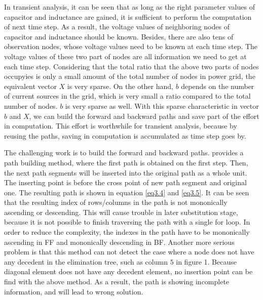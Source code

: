 \documentclass[conference]{IEEEtran}
\begin{document}
In transient analysis, it can be seen that as long as the right parameter values of capacitor and inductance are gained, it is 
sufficient to 
perform the computation of next time step. As a result, the voltage values of neighboring nodes of capacitor and inductance should be 
known. Besides, there are also tens of observation nodes, whose voltage values need to be known at each time step. The voltage values of
these two part of nodes are all information we need to get at each time step. Considering that the
total ratio that the above two parts of nodes occupyies is only a small amount of the total number of nodes in power grid, the equivalent
vector $X$ is very sparse. On the other hand, $b$ depends on the number of current sources in the grid, which is very small a ratio 
compared to the total number of nodes. $b$ is very sparse as well. With this sparse characteristic in vector $b$ and $X$, we can build the
forward and backward paths and save part of the effort in computation. This effort is worthwhile for transient analysis, because by 
reusing the paths, saving in computation is accumulated as time step goes by.

The challenging work is to build the forward and backward paths. \cite{Tinney} provides a path building method, where the first path is 
obtained on the first step. Then, the next path segments will be inserted into the original path as a whole unit. The inserting point is 
before the cross point of new path segment and original one. The resulting path is shown in equation \eqref{eq3.4} and \eqref{eq3.5}. It
can be seen that the resulting index of rows/columns in the path is not mononically ascending or descending. This will cause trouble in
later substitution stage, because it is not possible to finish traversing the path with a single for loop. In order to reduce the 
complexity, the indexes in the path have to be mononically ascending in FF and mononically descending in BF. Another more serious problem
is that this method can not detect the case where a node does not have any decedent in the elimination tree, such as column $5$ in figure 
1. Because diagonal element does not have any decedent element, no insertion point can be find with the above method. As a result, the 
path is showing incomplete information, and will lead to wrong solution. 
\end{document}
